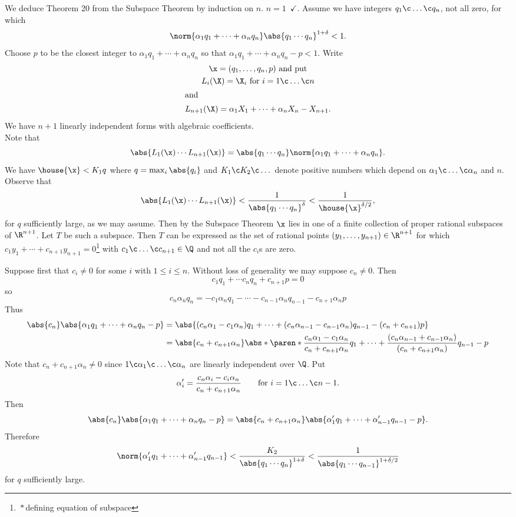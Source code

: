 We deduce Theorem 20 from the Subspace Theorem by induction on $n$.  $n=1$~$\checkmark$.  Assume we have integers $q_1\c \dotsc\c q_n$, not all zero, for which
\[ \norm{\alpha_1q_1+\dotsb+\alpha_nq_n}\abs{q_1\dotsm q_n}^{1+\delta} < 1 . \]
Choose $p$ to be the closest integer to $\alpha_1q_1+\dotsb+\alpha_nq_n$ so that $\alpha_1q_1+\dotsb+\alpha_nq_n-p<1$.  Write
\begin{gather*}
\x = (q_1,\dotsc,q_n,p) \text{ and put} \\
L_i(\X) = \X_i \text{ for $i=1\c \dotsc\c n$} \\
\shortintertext{and}
L_{n+1}(\X) = \alpha_1X_1+\dotsb+\alpha_nX_n-X_{n+1} .
\end{gather*}
We have $n+1$ linearly independent forms with algebraic coefficients. \\
Note that
\[ \abs{L_1(\x)\dotsm L_{n+1}(\x)} = \abs{q_1\dotsm q_n}\norm{\alpha_1q_1+\dotsb+\alpha_nq_n} . \]
We have $\house{\x}<K_1q$ where $q=\max_i\abs{q_i}$ and $K_1\c K_2\c \dotsc$ denote positive numbers which depend on $\alpha_1\c \dotsc\c \alpha_n$ and $n$. %
Observe that
\[ \abs{L_1(\x)\dotsm L_{n+1}(\x)} < \frac{1}{\abs{q_1\dotsm q_n}^\delta} < \frac{1}{\house{\x}^{\delta/2}} , \]
for $q$ sufficiently large, as we may assume.  Then by the Subspace Theorem $\x$ lies in one of a finite collection of proper rational subspaces of $\R^{n+1}$.  Let $T$ be such a subspace.  Then $T$ can be expressed as the set of rational points $(y_1,\dotsc,y_{n+1})\in\R^{n+1}$ for which $c_1y_1+\dotsb+c_{n+1}y_{n+1}=0$\footnote{\,$*$\;\,defining equation of subspace} with $c_1\c \dotsc\c c_{n+1}\in\Q$ and not all the $c_i$s are zero.

Suppose first that $c_i\neq0$ for some $i$ with $1\leq i\leq n$.  Without loss of generality we may suppose $c_n\neq0$.  Then
\[ c_1q_1+\dotsb c_nq_n + c_{n+1}p = 0 \]
so
\[ c_n\alpha_nq_n = -c_1\alpha_nq_1 - \dotsb -c_{n-1}\alpha_nq_{n-1} - c_{n+1}\alpha_np \]
Thus
\begin{align*}
\abs{c_n}\abs{\alpha_1q_1+\dotsb+\alpha_nq_n-p}
&= \abs{(c_n\alpha_1-c_1\alpha_n)q_1+\dotsb+(c_n\alpha_{n-1}-c_{n-1}\alpha_n)q_{n-1}-(c_n+c_{n+1})p} \\
&= \abs{c_n+c_{n+1}\alpha_n}\abs*{\paren*{\frac{c_n\alpha_1-c_1\alpha_n}{c_n+c_{n+1}\alpha_n}}q_1+\dotsb+\frac{(c_n\alpha_{n-1}+c_{n-1}\alpha_n)}{(c_n+c_{n+1}\alpha_n)}q_{n-1}-p}
\end{align*}
Note that $c_n+c_{n+1}\alpha_n\neq0$ since $1\c \alpha_1\c \dotsc\c \alpha_n$ are linearly independent over $\Q$.  Put
\[ \alpha'_i = \frac{c_n\alpha_i-c_i\alpha_n}{c_n+c_{n+1}\alpha_n} \qquad\text{for $i=1\c \dotsc\c n-1$} . \]
Then
\[ \abs{c_n}\abs{\alpha_1q_1+\dotsb+\alpha_nq_n-p} = \abs{c_n+c_{n+1}\alpha_n}\abs{\alpha'_1q_1+\dotsb+\alpha'_{n-1}q_{n-1}-p} . \]
Therefore
\[ \norm{\alpha'_1q_1+\dotsb+\alpha'_{n-1}q_{n-1}} < \frac{K_2}{\abs{q_1\dotsm q_n}^{1+\delta}} < \frac{1}{\abs{q_1\dotsm q_{n-1}}^{1+\delta/2}} \]
for $q$ sufficiently large.

